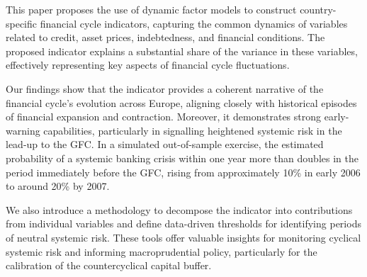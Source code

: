 This paper proposes the use of dynamic factor models to construct country-specific financial cycle indicators, capturing the common dynamics of variables related to credit, asset prices, indebtedness, and financial conditions. The proposed indicator explains a substantial share of the variance in these variables, effectively representing key aspects of financial cycle fluctuations.

Our findings show that the indicator provides a coherent narrative of the financial cycle's evolution across Europe, aligning closely with historical episodes of financial expansion and contraction. Moreover, it demonstrates strong early-warning capabilities, particularly in signalling heightened systemic risk in the lead-up to the GFC. In a simulated out-of-sample exercise, the estimated probability of a systemic banking crisis within one year more than doubles in the period immediately before the GFC, rising from approximately 10\% in early 2006 to around 20\% by 2007.

We also introduce a methodology to decompose the indicator into contributions from individual variables and define data-driven thresholds for identifying periods of neutral systemic risk. These tools offer valuable insights for monitoring cyclical systemic risk and informing macroprudential policy, particularly for the calibration of the countercyclical capital buffer.

